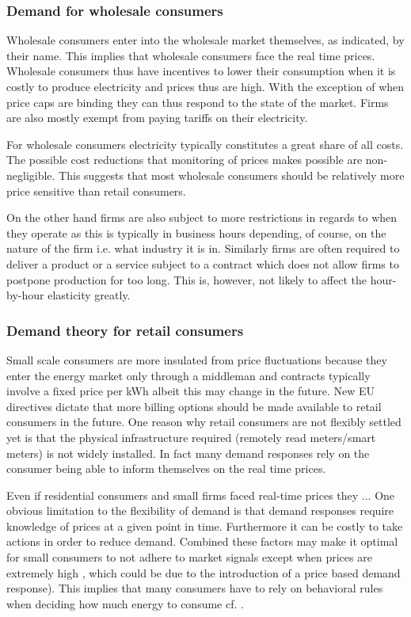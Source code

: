 \subsubsection*{Demand for wholesale consumers}
Wholesale consumers enter into the wholesale market themselves, as indicated, by their name. This implies that wholesale consumers face the real time prices. Wholesale consumers thus have incentives to lower their consumption when it is costly to produce electricity and prices thus are high. With the exception of when price caps are binding they can thus respond to the state of the market. Firms are also mostly exempt from paying tariffs on their electricity.
\medskip

For wholesale consumers electricity typically constitutes a great share of all costs. The possible cost reductions that monitoring of prices makes possible are non-negligible. This suggests that most wholesale consumers should be relatively more price sensitive than retail consumers.
\medskip

On the other hand firms are also subject to more restrictions in regards to when they operate as this is typically in business hours depending, of course, on the nature of the firm i.e. what industry it is in. Similarly firms are often required to deliver a product or a service subject to a contract which does not allow firms to postpone production for too long. This is, however, not likely to affect the hour-by-hour elasticity greatly. %

\subsubsection*{Demand theory for retail consumers}
Small scale consumers are more insulated from price fluctuations because they enter the energy market only through a middleman and contracts typically involve a fixed price per kWh albeit this may change in the future. New EU directives dictate that more billing options should be made available to retail consumers in the future. One reason why retail consumers are not flexibly settled yet is that the physical infrastructure required (remotely read meters/smart meters) is not widely installed. In fact many demand responses rely on the consumer being able to inform themselves on the real time prices.
\medskip 

Even if residential consumers and small firms faced real-time prices they ...
One obvious limitation to the flexibility of demand is that demand responses require knowledge of prices at a given point in time. Furthermore it can be costly to take actions in order to reduce demand. Combined these factors may make it optimal for small consumers to not adhere to market signals except when prices are extremely high \citep{wolak2011residential}, which could be due to the introduction of a price based demand response). This implies that many consumers have to rely on behavioral rules when deciding how much energy to consume cf. \citet{kirschen2003demand}.\par

